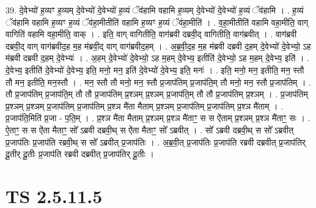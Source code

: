 \documentclass[17pt]{extarticle}
\begin{document}
39. दे॒वेभ्यो॑ ह॒व्यꣳ ह॒व्यम् दे॒वेभ्यो॑ दे॒वेभ्यो॑ ह॒व्यं ॅव॑हामि वहामि ह॒व्यम् दे॒वेभ्यो॑ दे॒वेभ्यो॑ ह॒व्यं ॅव॑हामि । . ह॒व्यं ॅव॑हामि वहामि ह॒व्यꣳ ह॒व्यं ॅव॑हा॒मीतीति॑ वहामि ह॒व्यꣳ ह॒व्यं ॅव॑हा॒मीति॑ । . व॒हा॒मीतीति॑ वहामि वहा॒मीति॒ वाग् वागिति॑ वहामि वहा॒मीति॒ वाक् । . इति॒ वाग् वागितीति॒ वाग॑ब्रवी दब्रवी॒द् वागितीति॒ वाग॑ब्रवीत् । . वाग॑ब्रवी दब्रवी॒द् वाग् वाग॑ब्रवीद॒ह म॒ह म॑ब्रवी॒द् वाग् वाग॑ब्रवीद॒हम् । . अ॒ब्र॒वी॒द॒ह म॒ह म॑ब्रवी दब्रवी द॒हम् दे॒वेभ्यो॑ दे॒वेभ्यो॒ ऽह म॑ब्रवी दब्रवी द॒हम् दे॒वेभ्यः॑ । . अ॒हम् दे॒वेभ्यो॑ दे॒वेभ्यो॒ ऽह म॒हम् दे॒वेभ्य॒ इतीति॑ दे॒वेभ्यो॒ ऽह म॒हम् दे॒वेभ्य॒ इति॑ । . दे॒वेभ्य॒ इतीति॑ दे॒वेभ्यो॑ दे॒वेभ्य॒ इति॒ मनो॒ मन॒ इति॑ दे॒वेभ्यो॑ दे॒वेभ्य॒ इति॒ मनः॑ । . इति॒ मनो॒ मन॒ इतीति॒ मन॒ स्तौ तौ मन॒ इतीति॒ मन॒स्तौ । . मन॒ स्तौ तौ मनो॒ मन॒ स्तौ प्र॒जाप॑तिम् प्र॒जाप॑ति॒म् तौ मनो॒ मन॒ स्तौ प्र॒जाप॑तिम् । . तौ प्र॒जाप॑तिम् प्र॒जाप॑ति॒म् तौ तौ प्र॒जाप॑तिम् प्र॒श्ञम् प्र॒श्ञम् प्र॒जाप॑ति॒म् तौ तौ प्र॒जाप॑तिम् प्र॒श्ञम् । . प्र॒जाप॑तिम् प्र॒श्ञम् प्र॒श्ञम् प्र॒जाप॑तिम् प्र॒जाप॑तिम् प्र॒श्ञ मै॑ता मैताम् प्र॒श्ञम् प्र॒जाप॑तिम् प्र॒जाप॑तिम् प्र॒श्ञ मै॑ताम् । . प्र॒जाप॑ति॒मिति॑ प्र॒जा - प॒ति॒म् । . प्र॒श्ञ मै॑ता मैताम् प्र॒श्ञम् प्र॒श्ञ मै॑ताꣳ॒॒ स स ऐ॑ताम् प्र॒श्ञम् प्र॒श्ञ मै॑ताꣳ॒॒ सः । . ऐ॒ताꣳ॒॒ स स ऐ॑ता मैताꣳ॒॒ सो᳚ ऽब्रवी दब्रवी॒थ् स ऐ॑ता मैताꣳ॒॒ सो᳚ ऽब्रवीत् । . सो᳚ ऽब्रवी दब्रवी॒थ् स सो᳚ ऽब्रवीत् प्र॒जाप॑तिः प्र॒जाप॑ति रब्रवी॒थ् स सो᳚ ऽब्रवीत् प्र॒जाप॑तिः । . अ॒ब्र॒वी॒त् प्र॒जाप॑तिः प्र॒जाप॑ति रब्रवी दब्रवीत् प्र॒जाप॑तिर् दू॒तीर् दू॒तीः प्र॒जाप॑ति रब्रवी दब्रवीत् प्र॒जाप॑तिर् दू॒तीः । \newline
\pagebreak
{}
\section*{ TS 2.5.11.5 }
\end{document}
